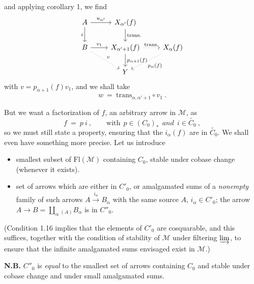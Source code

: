 \documentclass[11pt]{article}
\newcommand{\printedpage}[1]{\marginpar{\footnotesize p.~#1}}
\newcommand{\msp}[1]{\marginpar{\footnotesize [#1]}}
\newcommand{\cM}{\mathcal{M}}
\newcommand{\Fl}{\mathrm{Fl}}
\begin{document}
\printedpage{7}
and applying corollary 1, we find
\[
\begin{tikzcd}
A \arrow[r, "u_{\alpha'}"] \arrow[d, "i"'] & X_{\alpha'}(f) \arrow[d, "\text{trans.}"] & \\
B \arrow[r, "v_1"] \arrow[dr, dotted, "v"] & X_{\alpha'+1}(f) \arrow[r, dotted, "\text{trans.}"] \arrow[d, "p_{\alpha+1}(f)"] & X_\alpha(f) \arrow[dl, dotted, "p_\alpha(f)"] \\ %
 & Y &
\end{tikzcd}
\]
with $v = p_{\alpha+1}(f)v_1$, and we shall take %
\[
w \ = \ \mathrm{trans}_{\alpha,\alpha'+1} \circ v_1 \ .
\]

\msp{page 8}

But we want a factorization of $f$, an arbitrary arrow in $\cM$, as
\[
f \ = \ p\ i \ , \qquad \text{with} \ \ p \in (C_0)_* \ \ \textit{and} \ \ i \in \widetilde{C_0} \ ,
\]
so we must still state a property, ensuring that the $i_\alpha(f)$ are in $\widetilde{C_0}$. We shall even have something more precise. Let us introduce

\begin{itemize}[leftmargin=10em, labelwidth=9em, labelsep=1em, align=left]
\item[(1.18)\hfill $C'_0 \ = $] smallest subset of $\Fl(\cM)$ containing $C_0$, stable under cobase change (whenever it exists).
\item[\hfill $C''_0 \ = $] set of arrows which are either in $C'_0$, or amalgamated sums of a \textit{nonempty} family of such arrows $A \xrightarrow{i_\alpha} B_\alpha$ with the same source $A$, $i_\alpha \in C'_0$; the arrow $A \longrightarrow B = \displaystyle\coprod_{\alpha}{}_{(A)} B_\alpha$ is in $C''_0$.
\end{itemize}

(Condition 1.16 implies that the elements of $C'_0$ are cosquarable, and this suffices, together with the condition of stability of $\cM$ under filtering $\varinjlim$, to ensure that the infinite amalgamated sums envisaged exist in $\cM$.)

\textbf{N.B.} $C''_0$ is \textit{equal} to the smallest set of arrows containing $C_0$ and stable under cobase change and under small amalgamated sums.
\end{document}
